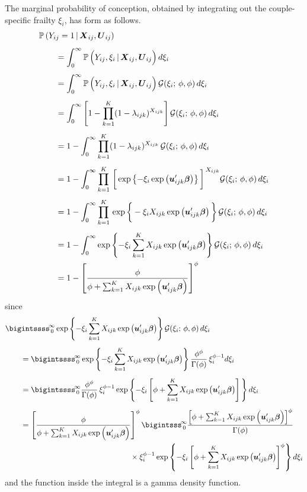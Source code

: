 \documentclass[11pt]{article}
\newcommand{\prob}{\mathbb{P}\,}
\renewcommand{\vec}{\boldsymbol}
\newcommand{\barS}{\,|\,}
\begin{document}
The marginal probability of conception, obtained by integrating out the couple-specific frailty $\xi_i$, has form as follows.
\begin{align*} \MoveEqLeft
\prob (Y_{ij} = 1 \barS \vec{X}_{ij}, \vec{U}_{ij}) \\[1ex]
&= \int_0^\infty \prob \Big( Y_{ij}, \xi_i \barS \vec{X}_{ij}, \vec{U}_{ij} \Big)\, d\xi_i \\[1ex]
&= \int_0^\infty \prob \Big( Y_{ij}, \xi_i \barS \vec{X}_{ij}, \vec{U}_{ij} \Big)\, \mathcal{G}(\xi_i;\, \phi,\phi)\, d\xi_i \\[1ex]
&= \int_0^\infty \left[ 1 - \prod_{k=1}^K (1 - \lambda_{ijk})^{X_{ijk}} \right] \mathcal{G}(\xi_i;\, \phi,\phi)\, d\xi_i \\[1ex]
&= 1 - \int_0^\infty \prod_{k=1}^K (1 - \lambda_{ijk})^{X_{ijk}}\, \mathcal{G}(\xi_i;\, \phi,\phi)\, d\xi_i \\[1ex]
&= 1 - \int_0^\infty \prod_{k=1}^K\, \bigg[ \exp\left\{ -\xi_i \exp\left( \vec{u}_{ijk}^\prime \vec{\beta} \right)\right\} \bigg]^{\,X_{ijk}} \mathcal{G}(\xi_i;\, \phi,\phi)\, d\xi_i \\[1ex]
&= 1 - \int_0^\infty \prod_{k=1}^K\, \exp\bigg\{ -\xi_i X_{ijk} \exp\left( \vec{u}_{ijk}^\prime \vec{\beta} \right)\bigg\}\, \mathcal{G}(\xi_i;\, \phi,\phi)\, d\xi_i \\[1ex]
&= 1 - \int_0^\infty \exp\left\{ -\xi_i \sum_{k=1}^K X_{ijk} \exp\left( \vec{u}_{ijk}^\prime \vec{\beta} \right)\right\} \mathcal{G}(\xi_i;\, \phi,\phi)\, d\xi_i \\
&= 1 - \left[ \frac{ \phi }{ \phi + \sum_{k=1}^K X_{ijk} \exp\left( \vec{u}_{ijk}^\prime \vec{\beta} \right) } \right]^\phi
\end{align*}
since
\begin{align*} \MoveEqLeft
\bigintssss_{\,0}^{\!\infty} \exp\left\{ -\xi_i \sum_{k=1}^K X_{ijk} \exp\left( \vec{u}_{ijk}^\prime \vec{\beta} \right)\right\} \mathcal{G}(\xi_i;\, \phi,\phi)\, d\xi_i \\[1ex]
&= \bigintssss_{\,0}^{\!\infty} \exp\left\{ -\xi_i \sum_{k=1}^K X_{ijk} \exp\left( \vec{u}_{ijk}^\prime \vec{\beta} \right)\right\} \frac{ \phi^\phi }{ \Gamma(\phi) }\, \xi_i^{\phi-1} d\xi_i \\[1ex]
&= \bigintssss_{\,0}^{\!\infty} \frac{ \phi^\phi }{ \Gamma(\phi) }\, \xi_i^{\phi-1} \exp\left\{ -\xi_i \left[ \phi + \sum_{k=1}^K X_{ijk} \exp\left( \vec{u}_{ijk}^\prime \vec{\beta} \right) \right]\, \right\} d\xi_i \\[1ex]
&= \left[ \frac{ \phi }{ \phi + \sum_{k=1}^K X_{ijk} \exp\left( \vec{u}_{ijk}^\prime \vec{\beta} \right) } \right]^\phi \bigintsss_{\,0}^{\!\infty} \frac{ \left[ \phi + \sum_{k=1}^K X_{ijk} \exp\left( \vec{u}_{ijk}^\prime \vec{\beta} \right) \right]^\phi }{ \Gamma(\phi) } \\
& \hspace{50mm} \times \xi_i^{\phi-1} \exp \left\{ -\xi_i \left[ \phi + \sum_{k=1}^K X_{ijk} \exp\left( \vec{u}_{ijk}^\prime \vec{\beta} \right) \right]^\phi \right\} d\xi_i
\end{align*}
and the function inside the integral is a gamma density function.
\end{document}
